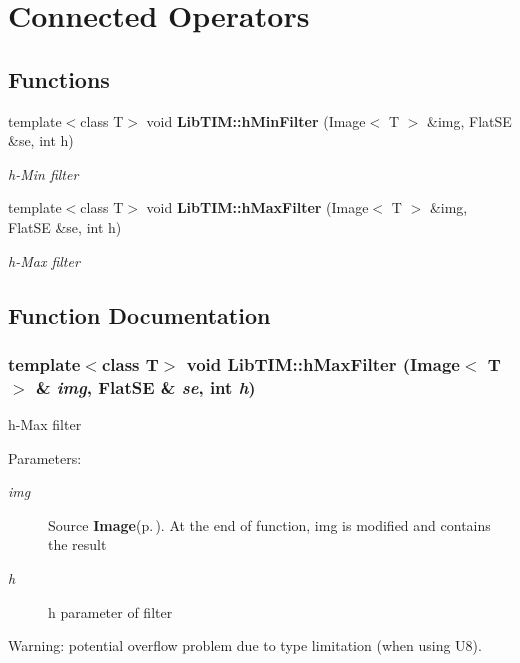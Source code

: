 \section{Connected Operators}
\label{group__connectedOperators}
\subsection*{Functions}
\begin{CompactItemize}
\item 
template$<$class T$>$ void {\bf Lib\-TIM::h\-Min\-Filter} (Image$<$ T $>$ \&img, Flat\-SE \&se, int h)
\begin{CompactList}\small\item\em h-Min filter \item\end{CompactList}\item 
template$<$class T$>$ void {\bf Lib\-TIM::h\-Max\-Filter} (Image$<$ T $>$ \&img, Flat\-SE \&se, int h)
\begin{CompactList}\small\item\em h-Max filter \item\end{CompactList}\end{CompactItemize}


\subsection{Function Documentation}
\subsubsection{\setlength{\rightskip}{0pt plus 5cm}template$<$class T$>$ void Lib\-TIM::h\-Max\-Filter (Image$<$ T $>$ \& {\em img}, Flat\-SE \& {\em se}, int {\em h})}\label{group__connectedOperators_ga1}


h-Max filter 

\begin{Desc}
\item[Parameters:]
\begin{description}
\item[{\em img}]Source {\bf Image}{\rm (p.\,\pageref{classLibTIM_1_1Image})}. At the end of function, img is modified and contains the result \item[{\em h}]h parameter of filter\end{description}
\end{Desc}
Warning: potential overflow problem due to type limitation (when using U8).
